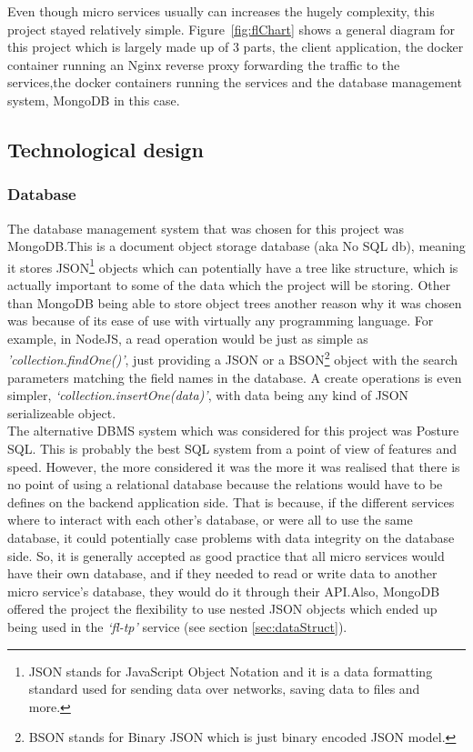 \documentclass{article}
\newcommand{\vspaceconst}{-2ex}
\begin{document}
\begin{multicols}{2}
Even though micro services usually can increases the hugely complexity, this project stayed relatively simple. Figure~\ref{fig:flChart} shows a general diagram for this project which is largely made up of 3 parts, the client application, the docker container running an Nginx reverse proxy forwarding the traffic to the services,the docker containers running the services and the database management system, MongoDB in this case.\\

\subsection{Technological design}
\vspace{\vspaceconst}

\subsubsection{Database}
\vspace{\vspaceconst}

The database management system that was chosen for this project was MongoDB.\@ This is a document object storage database (aka No SQL db), meaning it stores JSON\footnote{JSON stands for JavaScript Object Notation and it is a data formatting standard used for sending data over networks, saving data to files and more.} objects which can potentially have a tree like structure, which is actually important to some of the data which the project will be storing. Other than MongoDB being able to store object trees another reason why it was chosen was because of its ease of use with virtually any programming language. For example, in NodeJS, a read operation would be just as simple as \textit{'collection.findOne({})'}, just providing a JSON or a BSON\footnote{BSON stands for Binary JSON which is just binary encoded JSON model.} object with the search parameters matching the field names in the database. A create operations is even simpler, \textit{`collection.insertOne(data)'}, with data being any kind of JSON serializeable object.\\
The alternative DBMS system which was considered for this project was Posture SQL. This is probably the best SQL system from a point of view of features and speed. However, the more considered it was the more it was realised that there is no point of using a relational database because the relations would have to be defines on the backend application side. That is because, if the different services where to interact with each other's database, or were all to use the same database, it could potentially case problems with data integrity on the database side. So, it is generally accepted as good practice that all micro services would have their own database, and if they needed to read or write data to another micro service's database, they would do it through their API.\@ Also, MongoDB offered the project the flexibility to use nested JSON objects which ended up being used in the \textit{`fl-tp'} service (see section \ref{sec:dataStruct}).


\end{multicols}
\end{document}
